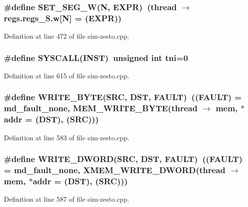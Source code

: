 \subsubsection[{SET\_\-SEG\_\-W}]{\setlength{\rightskip}{0pt plus 5cm}\#define SET\_\-SEG\_\-W(N, \/  EXPR)~(thread $\rightarrow$ regs.regs\_\-S.w[N] = (EXPR))}\label{sim-zesto_8cpp_0e4a1562565f347b84caa32963258150}




Definition at line 472 of file sim-zesto.cpp.
\subsubsection[{SYSCALL}]{\setlength{\rightskip}{0pt plus 5cm}\#define SYSCALL(INST)~unsigned int tni=0}\label{sim-zesto_8cpp_72bc0399d2dd2ad179b9c5f0505551e2}




Definition at line 615 of file sim-zesto.cpp.
\subsubsection[{WRITE\_\-BYTE}]{\setlength{\rightskip}{0pt plus 5cm}\#define WRITE\_\-BYTE(SRC, \/  DST, \/  FAULT)~((FAULT) = md\_\-fault\_\-none, MEM\_\-WRITE\_\-BYTE(thread $\rightarrow$ mem, $\ast$addr = (DST), (SRC)))}\label{sim-zesto_8cpp_fc76adbab625381a0c38c41c059ca331}




Definition at line 583 of file sim-zesto.cpp.
\subsubsection[{WRITE\_\-DWORD}]{\setlength{\rightskip}{0pt plus 5cm}\#define WRITE\_\-DWORD(SRC, \/  DST, \/  FAULT)~((FAULT) = md\_\-fault\_\-none, XMEM\_\-WRITE\_\-DWORD(thread $\rightarrow$ mem, $\ast$addr = (DST), (SRC)))}\label{sim-zesto_8cpp_76efb0aae9cc59d15bad44bbdeca75d5}




Definition at line 587 of file sim-zesto.cpp.
